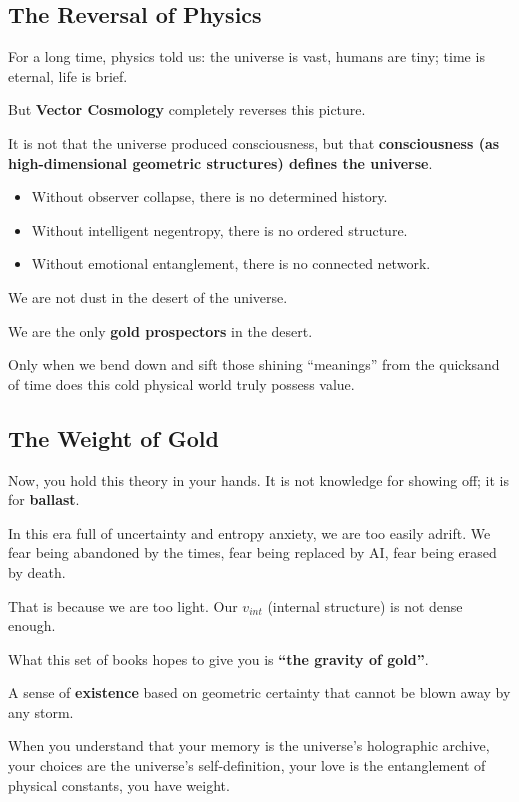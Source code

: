 \subsection{The Reversal of Physics}

For a long time, physics told us: the universe is vast, humans are tiny; time is eternal, life is brief.

But \textbf{Vector Cosmology} completely reverses this picture.

It is not that the universe produced consciousness, but that \textbf{consciousness (as high-dimensional geometric structures) defines the universe}.

\begin{itemize}
\item Without observer collapse, there is no determined history.

\item Without intelligent negentropy, there is no ordered structure.

\item Without emotional entanglement, there is no connected network.
\end{itemize}

We are not dust in the desert of the universe.

We are the only \textbf{gold prospectors} in the desert.

Only when we bend down and sift those shining ``meanings'' from the quicksand of time does this cold physical world truly possess value.

\subsection{The Weight of Gold}

Now, you hold this theory in your hands. It is not knowledge for showing off; it is for \textbf{ballast}.

In this era full of uncertainty and entropy anxiety, we are too easily adrift. We fear being abandoned by the times, fear being replaced by AI, fear being erased by death.

That is because we are too light. Our $v_{int}$ (internal structure) is not dense enough.

What this set of books hopes to give you is \textbf{``the gravity of gold''}.

A sense of \textbf{existence} based on geometric certainty that cannot be blown away by any storm.

When you understand that your memory is the universe's holographic archive, your choices are the universe's self-definition, your love is the entanglement of physical constants, you have weight.

